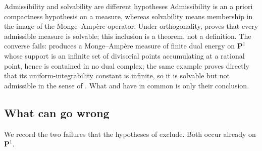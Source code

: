 \begin{warning}{Admissibility and solvability are different hypotheses}
Admissibility is an a priori compactness hypothesis on a measure, whereas
solvability means membership in the image of the Monge--Amp\`ere operator.
Under orthogonality,  proves that every
admissible measure is solvable; this inclusion is a theorem, not a
definition.  The converse fails:
 produces a Monge--Amp\`ere measure of
finite dual energy on $\mathbf P^1$ whose support is an infinite set of
divisorial points accumulating at a rational point, hence is contained in no
dual complex; the same example proves directly that its
uniform-integrability constant is infinite, so it is solvable but not
admissible in the sense of .  What
 and
 have in common is only their conclusion.
\end{warning}

\subsection{What can go wrong}
\label{sec:ch28-what-goes-wrong}

We record the two failures that the hypotheses of
 exclude.  Both occur already on
$\mathbf P^1$.

